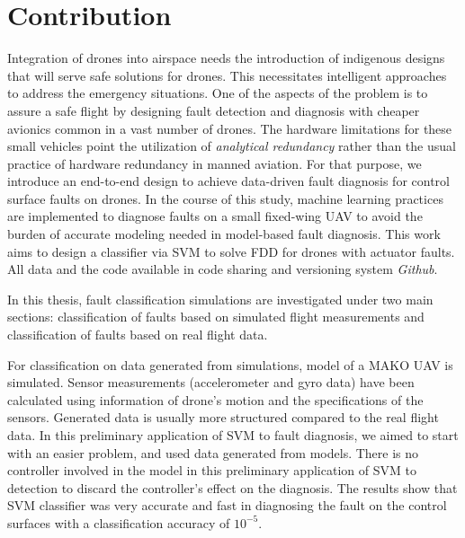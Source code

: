 \section{Contribution}

Integration of drones into airspace needs the introduction of indigenous designs that will serve safe solutions for drones. This necessitates intelligent approaches to address the emergency situations. One of the aspects of the problem is to assure a safe flight by designing fault detection and diagnosis with cheaper avionics common in a vast number of drones.
The hardware limitations for these small vehicles point the utilization of \emph{analytical redundancy} rather than the usual practice of hardware redundancy in manned aviation. 
For that purpose, we introduce an end-to-end design to achieve data-driven fault diagnosis for control surface faults on drones.
In the course of this study, machine learning practices are implemented to diagnose faults on a small fixed-wing UAV to avoid the burden of accurate modeling needed in model-based fault diagnosis. 
This work aims to design a classifier via SVM to solve FDD for drones with actuator faults.
All data and the code available in code sharing and versioning system \emph{Github}. 

In this thesis, fault classification simulations are investigated under two main sections: classification of faults based on simulated flight measurements and classification of faults based on real flight data. 

For classification on data generated from simulations, model of a MAKO UAV is simulated.
Sensor measurements (accelerometer and gyro data) have been calculated using information of drone's motion and the specifications of the sensors. 
Generated data is usually more structured compared to the real flight data. 
In this preliminary application of SVM to fault diagnosis, we aimed to start with an easier problem, and used data generated from models.
There is no controller involved in the model in this preliminary application of SVM to detection to discard the controller's effect on the diagnosis. 
The results show that SVM classifier was very accurate and fast in diagnosing the fault on the control surfaces with a classification accuracy of $10^{-5}$.

